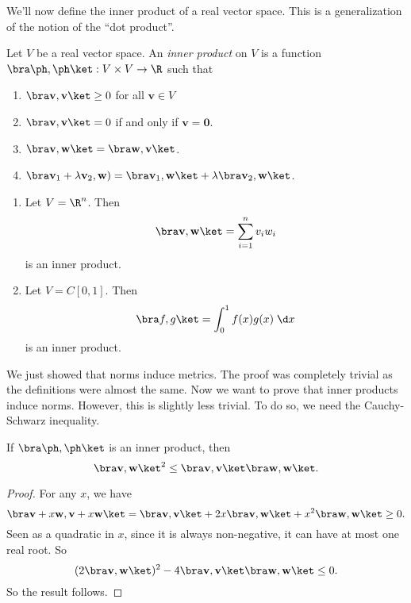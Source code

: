 \documentclass[a4paper]{article}
\begin{document}
We'll now define the inner product of a real vector space. This is a generalization of the notion of the ``dot product''.
\begin{defi}
  Let $V$ be a real vector space. An \emph{inner product} on $V$ is a function $\bra \ph, \ph\ket: V\times V \to \R$ such that
  \begin{enumerate}
    \item $\bra \mathbf{v}, \mathbf{v}\ket \geq 0$ for all $\mathbf{v}\in V$
    \item $\bra \mathbf{v}, \mathbf{v}\ket = 0$ if and only if $\mathbf{v} = \mathbf{0}$.
    \item $\bra \mathbf{v}, \mathbf{w}\ket = \bra \mathbf{w}, \mathbf{v}\ket$.
    \item $\bra \mathbf{v}_1 + \lambda \mathbf{v}_2, \mathbf{w}) = \bra \mathbf{v}_1, \mathbf{w}\ket + \lambda\bra \mathbf{v}_2 , \mathbf{w}\ket$.
  \end{enumerate}
\end{defi}

\begin{eg}\leavevmode
  \begin{enumerate}
    \item Let $V = \R^n$. Then
      \[
        \bra \mathbf{v}, \mathbf{w} \ket = \sum_{i = 1}^n v_i w_i
      \]
      is an inner product.
    \item Let $V = C[0, 1]$. Then
      \[
        \bra f, g\ket = \int_0^1 f(x) g(x) \;\d x
      \]
      is an inner product.
  \end{enumerate}
\end{eg}

We just showed that norms induce metrics. The proof was completely trivial as the definitions were almost the same. Now we want to prove that inner products induce norms. However, this is slightly less trivial. To do so, we need the Cauchy-Schwarz inequality.

\begin{thm}
  If $\bra\ph,\ph\ket$ is an inner product, then
  \[
    \bra \mathbf{v}, \mathbf{w}\ket^2 \leq \bra \mathbf{v}, \mathbf{v}\ket\bra\mathbf{w},\mathbf{w}\ket.
  \]
\end{thm}

\begin{proof}
  For any $x$, we have
  \[
    \bra \mathbf{v} + x\mathbf{w}, \mathbf{v} + x \mathbf{w}\ket = \bra \mathbf{v}, \mathbf{v}\ket + 2x\bra \mathbf{v}, \mathbf{w}\ket + x^2 \bra \mathbf{w}, \mathbf{w}\ket \geq 0.
  \]
  Seen as a quadratic in $x$, since it is always non-negative, it can have at most one real root. So
  \[
    (2 \bra \mathbf{v}, \mathbf{w}\ket)^2 - 4\bra \mathbf{v}, \mathbf{v}\ket \bra \mathbf{w}, \mathbf{w}\ket \leq 0.
  \]
  So the result follows.
\end{proof}
\end{document}
